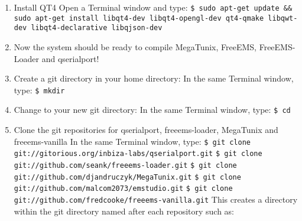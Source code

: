 \documentclass[12pt,notitlepage,onecolumn,oneside,openany]{memoir}
\begin{document}
\begin{enumerate}
\item \textsf{Install QT4} \newline
      \textsf{Open a Terminal window and type:} \newline
      \texttt{\$ sudo apt-get update \&\& sudo apt-get install libqt4-dev libqt4-opengl-dev qt4-qmake libqwt-dev libqt4-declarative libqjson-dev}

\item \textsf{Now the system should be ready to compile MegaTunix, FreeEMS, FreeEMS-Loader and qserialport!}

\item \textsf{Create a git directory in your home directory:} \newline
      \textsf{In the same Terminal window, type:} \newline
      \texttt{\$ mkdir }

\item \textsf{Change to your new git directory:} \newline
      \textsf{In the same Terminal window, type:} \newline
      \texttt{\$ cd } 

\item \textsf{Clone the git repositories for qserialport, freeems-loader, MegaTunix and freeems-vanilla} \newline
      \textsf{In the same Terminal window, type:} \newline
      \texttt{\$ git clone git://gitorious.org/inbiza-labs/qserialport.git} \newline
      \texttt{\$ git clone git://github.com/seank/freeems-loader.git} \newline
      \texttt{\$ git clone git://github.com/djandruczyk/MegaTunix.git} \newline
      \texttt{\$ git clone git://github.com/malcom2073/emstudio.git} \newline
      \texttt{\$ git clone git://github.com/fredcooke/freeems-vanilla.git} \newline
      \newline
      \textsf{This creates a directory within the git directory named after each repository such as:} \newline
       \newline	
       \newline
       \newline


\end{enumerate}
\end{document}
